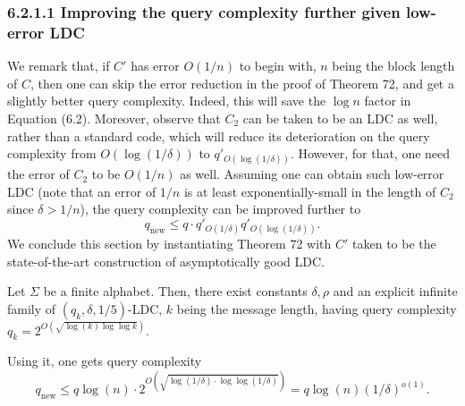 \subsubsection*{6.2.1.1 Improving the query complexity further given low-error LDC}
We remark that, if $C'$ has error $O(1/n)$ to begin with, $n$ being the block length of $C$, then one can skip the error reduction in the proof of Theorem 72, and get a slightly better query complexity. Indeed, this will save the $\log n$ factor in Equation (6.2). Moreover, observe that $C_2$ can be taken to be an LDC as well, rather than a standard code, which will reduce its deterioration on the query complexity from $O(\log(1/\delta))$ to $q'_{O(\log(1/\delta))}$. However, for that, one need the error of $C_2$ to be $O(1/n)$ as well. Assuming one can obtain such low-error LDC (note that an error of $1/n$ is at least exponentially-small in the length of $C_2$ since $\delta>1/n$), the query complexity can be improved further to
\[q_{\mathrm{new}}\leq q\cdot q'_{O(1/\delta)}q'_{O(\log(1/\delta))}.\]
We conclude this section by instantiating Theorem 72 with $C'$ taken to be the state-of-the-art construction of asymptotically good LDC.
\setcounter{nttheorem}{72}
\begin{nttheorem}
Let $\Sigma$ be a finite alphabet. Then, there exist constants $\delta,\rho$ and an explicit infinite family of $(q_k,\delta,1/5)$-LDC, $k$ being the message length, having query complexity $q_k=2^{O(\sqrt{\log(k)\log\log k})}$.
\end{nttheorem}
Using it, one gets query complexity
\[q_{\mathrm{new}}\leq q\log(n)\cdot2^{O(\sqrt{\log(1/\delta)\cdot\log\log(1/\delta)})}=q\log(n)(1/\delta)^{o(1)}.\]
